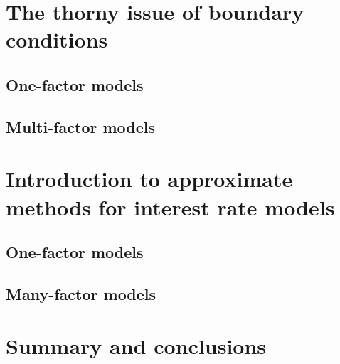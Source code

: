 \section{The thorny issue of boundary conditions}

\subsection{One-factor models}

\subsection{Multi-factor models}

\section{Introduction to approximate methods for interest rate models}

\subsection{One-factor models}

\subsection{Many-factor models}

\section{Summary and conclusions}